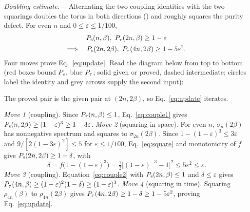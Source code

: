 \documentclass[aps,prl,reprint,amsmath,amssymb,nofootinbib,raggedbottom]{revtex4-2}
\begin{document}
\emph{Doubling estimate.---}
Alternating the two coupling identities with the two squarings doubles the
torus in both directions (\torusseq) and roughly squares the purity defect. For
even $n$ and $0\le\varepsilon\le1/100$,
\begin{equation}
 \begin{gathered}
 P_{\mathrm s}(n,\beta),\ P_{\tau}(2n,\beta)\ge1-\varepsilon\\
 \Longrightarrow\quad
 P_{\mathrm s}(2n,2\beta),\ P_{\tau}(4n,2\beta)\ge1-5\varepsilon^2.
 \end{gathered}
 \label{eq:update}
\end{equation}
Four moves prove Eq.~\eqref{eq:update}. Read the diagram below from top to
bottom (red boxes bound $P_{\mathrm s}$, blue $P_{\tau}$; solid given or proved, dashed
intermediate; circles label the identity and grey arrows supply the second
input):
\begin{proofdiagram}
\begin{prooflanes}
  
  
  
  
\end{prooflanes}
\end{proofdiagram}
The proved pair is the given pair at $(2n,2\beta)$, so Eq.~\eqref{eq:update} iterates.

\emph{Move 1} (coupling). Since $P_{\tau}(n,\beta)\le1$,
Eq.~\eqref{eq:couple1} gives $P_{\mathrm s}(n,2\beta)\ge(1-\varepsilon)^3\ge1-3\varepsilon$.
\emph{Move 2} (squaring in space). For even $n$, $\sigma_n(2\beta)$ has
nonnegative spectrum and squares to $\sigma_{2n}(2\beta)$. Since
$1-(1-\varepsilon)^3\le3\varepsilon$ and $9/[2(1-3\varepsilon)^2]\le5$ for
$\varepsilon\le1/100$, Eq.~\eqref{eq:square} and monotonicity of $f$ give
$P_{\mathrm s}(2n,2\beta)\ge1-\delta$, with
\begin{equation}
 \delta=f\bigl(1-(1-\varepsilon)^3\bigr)
 =\tfrac12\bigl[(1-\varepsilon)^{-3}-1\bigr]^2
 \le5\varepsilon^2\le\varepsilon.
 \label{eq:delta}
\end{equation}
\emph{Move 3} (coupling). Equation~\eqref{eq:couple2} with
$P_{\mathrm s}(2n,\beta)\le1$ and $\delta\le\varepsilon$ gives
$P_{\tau}(4n,\beta)\ge(1-\varepsilon)^2(1-\delta)\ge(1-\varepsilon)^3$.
\emph{Move 4} (squaring in time). Squaring $\rho_{4n}(\beta)$ to
$\rho_{4n}(2\beta)$ gives $P_{\tau}(4n,2\beta)\ge1-\delta\ge1-5\varepsilon^2$,
proving Eq.~\eqref{eq:update}.
\end{document}
